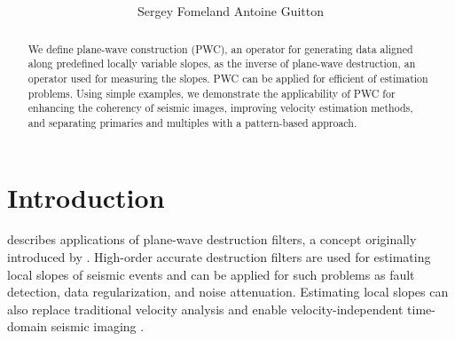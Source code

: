 \title{ }

\renewcommand{\thefootnote}{\fnsymbol{footnote}}


\author{Sergey Fomel\footnotemark[1] and
  Antoine Guitton\footnotemark[2]}

\address{
\footnotemark[1]Bureau of Economic Geology, \\
John A. and Katherine G. Jackson School of Geosciences \\
The University of Texas at Austin \\
University Station, Box X \\
Austin, TX 78713-8972 \\
\footnotemark[2]3DGeo Development Inc. \\
4633 Old Ironsides Drive, Suite 401 \\
Santa Clara, CA 95054}

\maketitle

\begin{abstract}
  We define plane-wave construction (PWC), an operator for generating
  data aligned along predefined locally variable slopes, as the
  inverse of plane-wave destruction, an operator used for measuring
  the slopes.  PWC can be applied for efficient 
   of   estimation
  problems. Using simple examples, we demonstrate the applicability of
  PWC for enhancing the coherency of seismic images, improving
  velocity estimation methods, and separating primaries and multiples
  with a pattern-based approach.
\end{abstract}

\section{Introduction}

\cite{GEO67-06-19461960} describes applications of plane-wave
destruction filters, a concept originally introduced by \cite{pvi}.
High-order accurate destruction filters are used for estimating local
slopes of seismic events and can be applied for such problems as fault
detection, data regularization, and noise attenuation.  Estimating
local slopes can also replace traditional velocity analysis and enable
velocity-independent time-domain seismic imaging \cite[]{pmig}.

